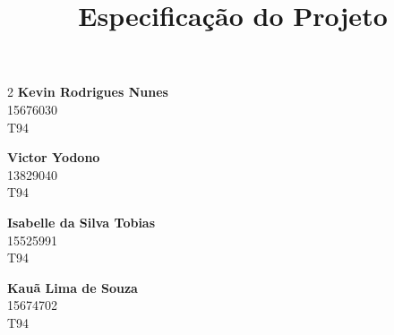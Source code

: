 \documentclass[a4paper]{article}
\title{
    \textbf{Especificação do Projeto}
}
\date{} %
\begin{document}
\maketitle
\vspace{-1.5cm}
\thispagestyle{firstpage}

\begin{multicols}{2}
    \centering    
    \textbf{Kevin Rodrigues Nunes}\\
            15676030\\
            T94

    \textbf{Victor Yodono}\\
            13829040\\
            T94

    \textbf{Isabelle da Silva Tobias}\\
            15525991\\
            T94

    \textbf{Kauã Lima de Souza}\\
            15674702\\
            T94

\end{multicols}

\singlespacing
\setlength{\parskip}{6pt}
\setlength{\parindent}{0.5cm}
\end{document}
